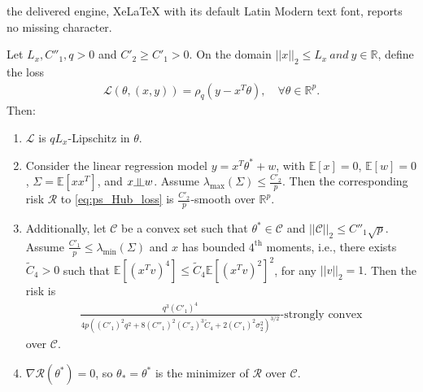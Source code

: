 \documentclass[10pt,a4paper]{amsart}
\newcommand{\indep}{\rotatebox[origin=c]{90}{$\models$}}
\begin{document}
the delivered engine, XeLaTeX with its default Latin Modern text font, reports no missing character.
\begin{lemma}
\label{lemma:pHu_prelim}
Let $L_x, C''_1, q > 0$ and $C'_2 \geq C'_1 > 0$. On the domain $||x||_2 \leq L_x \ and \ y \in \mathbb{R}$, define the loss
\begin{align}
\label{eq:ps_Hub_loss}
\mathcal{L}(\theta, (x, y)) = \rho_q(y - x^T\theta), \quad \forall \theta \in \mathbb{R}^p.
\end{align}
Then:
\begin{enumerate}
\item $\mathcal{L}$ is $qL_x$-Lipschitz in $\theta$.

\item Consider the linear regression model $y = x^T\theta^* + w$, with $\mathbb{E}[x] = 0$, $\mathbb{E}[w] = 0$, $\Sigma = \mathbb{E}[xx^T]$, and $x \indep w$. Assume $\lambda_{\max}(\Sigma) \leq \frac{C'_2}{p}$. Then the corresponding risk $\mathcal{R}$ to \eqref{eq:ps_Hub_loss} is $\frac{C'_2}{p}$-smooth over $\mathbb{R}^p$. 

\item Additionally, let $\mathcal{C}$ be a convex set such that $\theta^* \in \mathcal{C}$ and $||\mathcal{C}||_2 \leq C''_1\sqrt{p}$. Assume $\frac{C'_1}{p} \leq \lambda_{\min}(\Sigma)$ and $x$ has bounded $4^{\text{th}}$ moments, i.e., there exists $\widetilde{C}_4 > 0$ such that $\mathbb{E}\left[(x^Tv)^4\right] \leq \widetilde{C}_4\mathbb{E}\left[(x^Tv)^2\right]^2$, for any $||v||_2 = 1$. Then the risk is 
\begin{align*}
\frac{q^3(C'_1)^4}{4p\left((C'_1)^2q^2 + 8(C''_1)^2(C'_2)^3\widetilde{C}_4 + 2(C'_1)^2\sigma_2^2\right)^{3/2}}\mbox{-strongly convex}
\end{align*}
over $\mathcal{C}$. 

\item $\nabla\mathcal{R}(\theta^*) = 0$, so $\theta_{*} = \theta^*$ is the minimizer of $\mathcal{R}$ over $\mathcal{C}$.
\end{enumerate}
\end{lemma}
\end{document}
